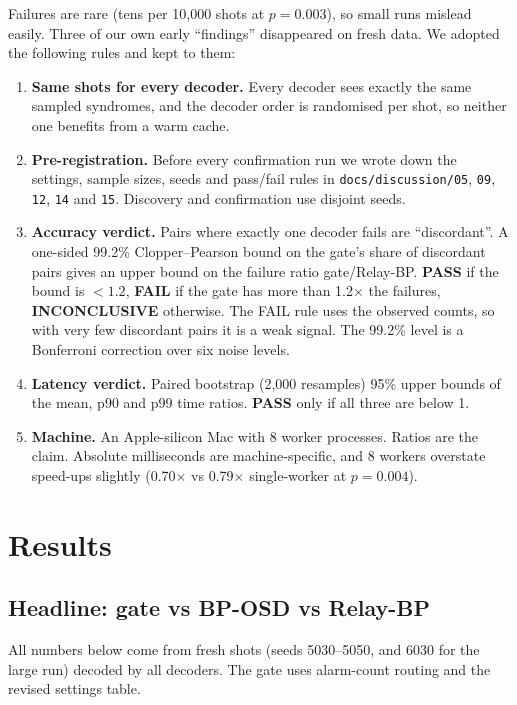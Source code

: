 \documentclass[11pt]{article}
\begin{document}
Failures are rare (tens per 10,000 shots at $p=0.003$), so small runs mislead easily. Three of our own early
``findings'' disappeared on fresh data. We adopted the following rules and kept to them:
\begin{enumerate}
  \item \textbf{Same shots for every decoder.} Every decoder sees exactly the same sampled syndromes, and the decoder order
        is randomised per shot, so neither one benefits from a warm cache.
  \item \textbf{Pre-registration.} Before every confirmation run we wrote down the settings, sample sizes, seeds and pass/fail rules in
        \texttt{docs/discussion/05}, \texttt{09}, \texttt{12}, \texttt{14} and \texttt{15}. Discovery and confirmation use
        disjoint seeds.
  \item \textbf{Accuracy verdict.} Pairs where exactly one decoder fails are ``discordant''. A one-sided 99.2\%
        Clopper--Pearson bound on the gate's share of discordant pairs gives an upper bound on the failure ratio
        gate/Relay-BP. \textbf{PASS} if the bound is $<1.2$, \textbf{FAIL} if the gate has more than 1.2$\times$ the failures,
        \textbf{INCONCLUSIVE} otherwise. The FAIL rule uses the observed counts, so with very few discordant pairs it is a weak signal. The 99.2\% level is a Bonferroni correction over six noise levels.
  \item \textbf{Latency verdict.} Paired bootstrap (2,000 resamples) 95\% upper bounds of the mean, p90 and p99 time
        ratios. \textbf{PASS} only if all three are below 1.
  \item \textbf{Machine.} An Apple-silicon Mac with 8 worker processes. Ratios are the claim. Absolute milliseconds are
        machine-specific, and 8 workers overstate speed-ups slightly (0.70$\times$ vs 0.79$\times$ single-worker at $p=0.004$).
\end{enumerate}

\section{Results}\label{sec:results}

\subsection{Headline: gate vs BP-OSD vs Relay-BP}

All numbers below come from fresh shots (seeds 5030--5050, and 6030 for the large run) decoded by all decoders. The gate uses
alarm-count routing and the revised settings table.
\end{document}
